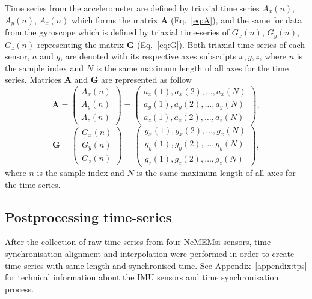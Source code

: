 Time series from the accelerometer are defined by triaxial time series 
$A_x(n)$, $A_y(n)$, $A_z(n)$ which forms the matrix $\boldsymbol{A}$ 
(Eq.~\ref{eq:A}), and the same for data from the gyroscope which is 
defined by triaxial time-series of $G_x(n)$, $G_y(n)$, $G_z(n)$ representing 
the matrix $\boldsymbol{G}$ (Eq.~\ref{eq:G}). Both triaxial time series of 
each sensor, $a$ and $g$, are denoted with its respective axes 
subscripts $x,y,z$, where $n$ is the sample index and $N$ is the same 
maximum length of all axes for the time series.
Matrices $\boldsymbol{A}$ and $\boldsymbol{G}$ are represented as follow
\begin{equation}\label{eq:A}
\boldsymbol{A} =
\begin{pmatrix}
  A_x(n) \\
  A_y(n) \\
  A_z(n)
\end{pmatrix}
=
\begin{pmatrix}
 a_x(1),a_x(2),\dots,a_x(N) \\
 a_y(1),a_y(2),\dots,a_y(N) \\
 a_z(1),a_z(2),\dots,a_z(N) 
\end{pmatrix},
\end{equation}
\begin{equation}\label{eq:G}
\boldsymbol{G} =
\begin{pmatrix}
 G_x(n) \\
 G_y(n) \\
 G_z(n)
\end{pmatrix}
=
\begin{pmatrix}
 g_x(1),g_x(2),\dots,g_x(N) \\
 g_y(1),g_y(2),\dots,g_y(N) \\
 g_z(1),g_z(2),\dots,g_z(N) 
\end{pmatrix},
\end{equation}
where $n$ is the sample index and $N$ is the same maximum length of all axes 
for the time series.

\subsection{Postprocessing time-series}
After the collection of raw time-series from four NeMEMsi sensors,
time synchronisation alignment and interpolation were performed 
in order to create time series with same length and synchronised time.
See Appendix~\ref{appendix:tps} for technical information 
about the IMU sensors and time synchronisation process.

